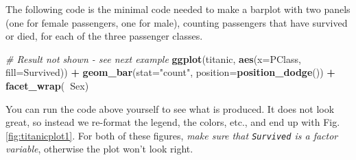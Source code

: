 \documentclass[]{book}
\newenvironment{Shaded}{\begin{snugshade}}{\end{snugshade}}
\newcommand{\CommentTok}[1]{\textcolor[rgb]{0.56,0.35,0.01}{\textit{#1}}}
\newcommand{\DataTypeTok}[1]{\textcolor[rgb]{0.13,0.29,0.53}{#1}}
\newcommand{\KeywordTok}[1]{\textcolor[rgb]{0.13,0.29,0.53}{\textbf{#1}}}
\newcommand{\NormalTok}[1]{#1}
\newcommand{\OperatorTok}[1]{\textcolor[rgb]{0.81,0.36,0.00}{\textbf{#1}}}
\newcommand{\StringTok}[1]{\textcolor[rgb]{0.31,0.60,0.02}{#1}}
\begin{document}
\begin{Shaded}
\end{Shaded}

The following code is the minimal code needed to make a barplot with two panels (one for female passengers, one for male), counting passengers that have survived or died, for each of the three passenger classes.

\begin{Shaded}
\begin{Highlighting}[]
\CommentTok{# Result not shown - see next example}
\KeywordTok{ggplot}\NormalTok{(titanic, }\KeywordTok{aes}\NormalTok{(}\DataTypeTok{x=}\NormalTok{PClass, }\DataTypeTok{fill=}\NormalTok{Survived)) }\OperatorTok{+}
\StringTok{  }\KeywordTok{geom_bar}\NormalTok{(}\DataTypeTok{stat=}\StringTok{"count"}\NormalTok{, }\DataTypeTok{position=}\KeywordTok{position_dodge}\NormalTok{()) }\OperatorTok{+}
\StringTok{  }\KeywordTok{facet_wrap}\NormalTok{(}\OperatorTok{~}\NormalTok{Sex)}
\end{Highlighting}
\end{Shaded}

You can run the code above yourself to see what is produced. It does not look great, so instead we re-format the legend, the colors, etc., and end up with Fig. \ref{fig:titanicplot1}. For both of these figures, \emph{make sure that \texttt{Survived} is a factor variable}, otherwise the plot won't look right.
\end{document}
